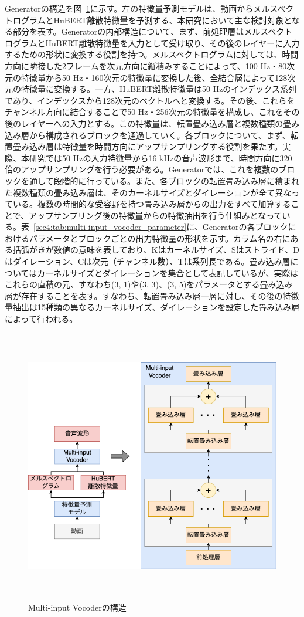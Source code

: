 \documentclass[12pt]{jarticle}
\numberwithin{equation}{section}    %
\numberwithin{figure}{section}      %
\numberwithin{table}{section}      %
\begin{document}
Generatorの構造を図~\ref{sec4:fig:multi-input_vocoder}に示す。左の特徴量予測モデルは、動画からメルスペクトログラムとHuBERT離散特徴量を予測する、本研究において主な検討対象となる部分を表す。Generatorの内部構造について、まず、前処理層はメルスペクトログラムとHuBERT離散特徴量を入力として受け取り、その後のレイヤーに入力するための形状に変換する役割を持つ。メルスペクトログラムに対しては、時間方向に隣接した2フレームを次元方向に縦積みすることによって、100 Hz・80次元の特徴量から50 Hz・160次元の特徴量に変換した後、全結合層によって128次元の特徴量に変換する。一方、HuBERT離散特徴量は50 Hzのインデックス系列であり、インデックスから128次元のベクトルへと変換する。その後、これらをチャンネル方向に結合することで50 Hz・256次元の特徴量を構成し、これをその後のレイヤーへの入力とする。この特徴量は、転置畳み込み層と複数種類の畳み込み層から構成されるブロックを通過していく。各ブロックについて、まず、転置畳み込み層は特徴量を時間方向にアップサンプリングする役割を果たす。実際、本研究では50 Hzの入力特徴量から16 kHzの音声波形まで、時間方向に320倍のアップサンプリングを行う必要がある。Generatorでは、これを複数のブロックを通して段階的に行っている。また、各ブロックの転置畳み込み層に積まれた複数種類の畳み込み層は、そのカーネルサイズとダイレーションが全て異なっている。複数の時間的な受容野を持つ畳み込み層からの出力をすべて加算することで、アップサンプリング後の特徴量からの特徴抽出を行う仕組みとなっている。表~\ref{sec4:tab:multi-input_vocoder_parameter}に、Generatorの各ブロックにおけるパラメータとブロックごとの出力特徴量の形状を示す。カラム名の右にある括弧がきが数値の意味を表しており、Kはカーネルサイズ、Sはストライド、Dはダイレーション、Cは次元（チャンネル数）、Tは系列長である。畳み込み層についてはカーネルサイズとダイレーションを集合として表記しているが、実際はこれらの直積の元、すなわち(3, 1)や(3, 3)、(3, 5)をパラメータとする畳み込み層が存在することを表す。すなわち、転置畳み込み層一層に対し、その後の特徴量抽出は15種類の異なるカーネルサイズ、ダイレーションを設定した畳み込み層によって行われる。
\begin{figure}[bt]
    \centering
    \includegraphics[height=120mm]{./figure/sec4/model/multi-input_vocoder.png}
    \caption{Multi-input Vocoderの構造}
    \label{sec4:fig:multi-input_vocoder}
\end{figure}
\end{document}
